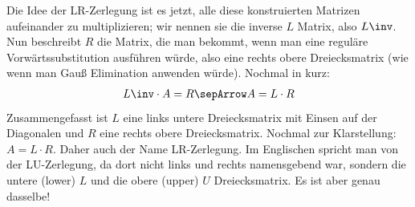 {%
%	
		\n 
		Die Idee der LR-Zerlegung ist es jetzt, alle diese konstruierten Matrizen aufeinander zu multiplizieren; wir nennen sie die inverse $L$ Matrix, also $L\inv$. Nun beschreibt $R$ die Matrix, die man bekommt, wenn man eine reguläre Vorwärtssubstitution ausführen würde, also eine rechts obere Dreiecksmatrix (wie wenn man Gauß Elimination anwenden würde).
		Nochmal in kurz: 
		\begin{align} 
			L\inv \cdot A = R \sepArrow A = L \cdot R
		\end{align}
		Zusammengefasst ist $L$ eine links untere Dreiecksmatrix mit Einsen auf der Diagonalen und $R$ eine rechts obere Dreiecksmatrix.
		\n
		Nochmal zur Klarstellung: $A = L \cdot R$. Daher auch der Name LR-Zerlegung. Im Englischen spricht man von der LU-Zerlegung, da dort nicht links und rechts namensgebend war, sondern die untere (lower) $L$ und die obere (upper) $U$ Dreiecksmatrix. Es ist aber genau dasselbe!
	}
	
	\sbreak
	
